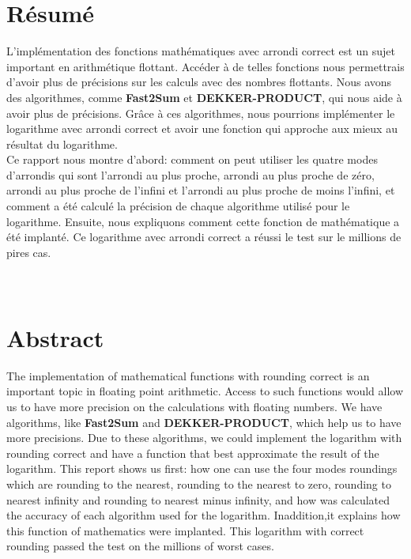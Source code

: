  
\section*{Résumé}
L'implémentation des fonctions mathématiques avec arrondi correct est un sujet important en arithmétique flottant. Accéder à de telles fonctions nous permettrais d'avoir plus de précisions sur les calculs avec des nombres flottants. Nous avons des algorithmes, comme \textbf{Fast2Sum} et \textbf{DEKKER-PRODUCT}, qui nous aide à avoir plus de précisions. Grâce à ces algorithmes, nous pourrions implémenter le logarithme avec arrondi correct et avoir une fonction qui approche aux mieux au résultat du logarithme.\\
Ce rapport nous montre d'abord: comment on peut utiliser les quatre modes d'arrondis qui sont l'arrondi au plus proche, arrondi au plus proche de zéro, arrondi au plus proche de l'infini et l'arrondi au plus proche de moins l'infini, et comment a été calculé la précision de chaque algorithme utilisé pour le logarithme. Ensuite, nous expliquons comment cette fonction de mathématique a été implanté. 
Ce logarithme avec arrondi correct a réussi le test sur le millions de pires cas. \\
\ \\
\ \\
\section*{Abstract} 
The implementation of mathematical functions with rounding
correct is an important topic in floating point arithmetic. Access to such
functions would allow us to have more precision on the calculations with
floating numbers. We have algorithms, like \textbf{Fast2Sum} and
\textbf{DEKKER-PRODUCT}, which help us to have more precisions. Due
to these algorithms, we could implement the logarithm with rounding
correct and have a function that best approximate the result of the logarithm.
This report shows us first: how one can use the four modes
roundings which are rounding to the nearest, rounding to the nearest to zero,
rounding to nearest infinity and rounding to nearest minus infinity,
and how was calculated the accuracy of each algorithm used for
the logarithm. Inaddition,it explains how this function of mathematics were implanted. This logarithm with correct rounding passed the test on the millions of
worst cases.
\newpage